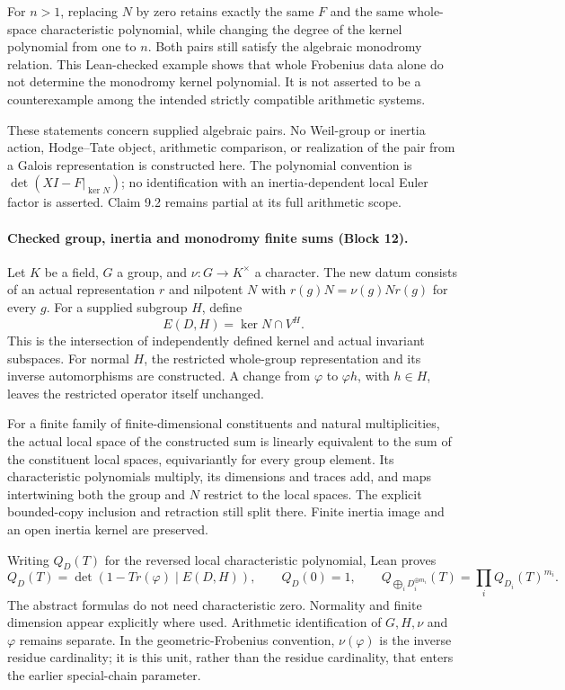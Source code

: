 \documentclass[11pt]{article}
\theoremstyle{definition}
\theoremstyle{remark}
\begin{document}
For $n>1$, replacing $N$ by zero retains exactly the same $F$ and the same
whole-space characteristic polynomial, while changing the degree of the kernel
polynomial from one to $n$. Both pairs still satisfy the algebraic monodromy
relation. This Lean-checked example shows that whole Frobenius data alone do
not determine the monodromy kernel polynomial. It is not asserted to be a
counterexample among the intended strictly compatible arithmetic systems.

These statements concern supplied algebraic pairs. No Weil-group or inertia
action, Hodge--Tate object, arithmetic comparison, or realization of the pair
from a Galois representation is constructed here. The polynomial convention is
$\det(XI-F|_{\ker N})$; no identification with an inertia-dependent local
Euler factor is asserted. Claim 9.2 remains partial at its full arithmetic scope.


\paragraph{Checked group, inertia and monodromy finite sums (Block 12).}
Let $K$ be a field, $G$ a group, and $\nu:G\to K^\times$ a character.
The new datum consists of an actual representation $r$ and nilpotent $N$ with
$r(g)N=\nu(g)Nr(g)$ for every $g$. For a supplied subgroup $H$, define
\[
 E(D,H)=\ker N\cap V^H.
\]
This is the intersection of independently defined kernel and actual invariant
subspaces. For normal $H$, the restricted whole-group representation and its
inverse automorphisms are constructed. A change from $\varphi$ to $\varphi h$,
with $h\in H$, leaves the restricted operator itself unchanged.

For a finite family of finite-dimensional constituents and natural multiplicities,
the actual local space of the constructed sum is linearly equivalent to the sum of the constituent local spaces, equivariantly
for every group element. Its characteristic polynomials multiply, its dimensions
and traces add, and maps intertwining both the group and $N$ restrict to the
local spaces. The explicit bounded-copy inclusion and retraction still split
there. Finite inertia image and an open inertia kernel are preserved.

Writing $Q_D(T)$ for the reversed local characteristic polynomial, Lean proves
\[
 Q_D(T)=\det(1-T r(\varphi)\mid E(D,H)),\qquad Q_D(0)=1,
 \qquad
 Q_{\bigoplus_iD_i^{\oplus m_i}}(T)=\prod_iQ_{D_i}(T)^{m_i}.
\]
The abstract formulas do not need characteristic zero. Normality and finite
dimension appear explicitly where used. Arithmetic identification of $G,H,\nu$
and $\varphi$ remains separate. In the geometric-Frobenius convention,
$\nu(\varphi)$ is the inverse residue cardinality; it is this unit, rather than
the residue cardinality, that enters the earlier special-chain parameter.
\end{document}
